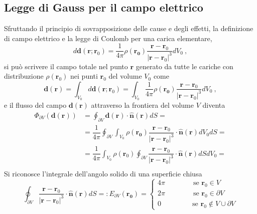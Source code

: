 \subsection{Legge di Gauss per il campo elettrico}
Sfruttando il principio di sovrapposizione delle cause e degli effetti, la definizione di campo elettrico e la legge di Coulomb per una carica elementare,
\begin{equation}
    d \mathbf{d}(\mathbf{r}; \mathbf{r}_0) = \dfrac{1}{4 \pi} \rho(\mathbf{r_0}) \dfrac{\mathbf{r} - \mathbf{r}_0}{|\mathbf{r} - \mathbf{r}_0|^3} dV_0 \ ,
\end{equation}
si può scrivere il campo totale nel punto $\mathbf{r}$ generato da tutte le cariche con distribuzione $\rho(\mathbf{r}_0)$ nei punti $\mathbf{r}_0$ del volume $V_0$ come
\begin{equation}
    \mathbf{d}(\mathbf{r}) = \int_{V_0} d \mathbf{d}(\mathbf{r}; \mathbf{r}_0 ) = 
    \int_{V_0} \dfrac{1}{4 \pi} \rho(\mathbf{r_0}) \dfrac{\mathbf{r} - \mathbf{r}_0}{|\mathbf{r} - \mathbf{r}_0|^3} dV_0   \ ,
\end{equation}
e il flusso del campo $\mathbf{d}(\mathbf{r})$ attraverso la frontiera del volume $V$ diventa
\begin{equation}
\begin{aligned}
    \Phi_{\partial V}(\mathbf{d}(\mathbf{r}))
    & = \oint_{\partial V} \mathbf{d}(\mathbf{r}) \cdot \mathbf{\hat{n}}(\mathbf{r}) dS = \\
    & = \dfrac{1}{4\pi} \oint_{\partial V} \int_{V_0} \rho(\mathbf{r_0}) \dfrac{\mathbf{r} - \mathbf{r}_0}{|\mathbf{r} - \mathbf{r}_0|^3} \cdot \mathbf{\hat{n}}(\mathbf{r}) dV_0 dS = \\
    & = \dfrac{1}{4\pi}  \int_{V_0} \rho(\mathbf{r}_0) \oint_{\partial V} \dfrac{\mathbf{r} - \mathbf{r}_0}{|\mathbf{r} - \mathbf{r}_0|^3} \cdot \mathbf{\hat{n}}(\mathbf{r}) dS dV_0 = \\
\end{aligned}
\end{equation}
Si riconosce l'integrale dell'angolo solido di una superficie chiusa
\begin{equation}
    \oint_{\partial V} \dfrac{\mathbf{r} - \mathbf{r}_0}{|\mathbf{r} - \mathbf{r}_0|^3} \cdot \mathbf{\hat{n}}(\mathbf{r}) dS =: E_{\partial V}(\mathbf{r_0}) = 
    \begin{cases}
        4 \pi \qquad \qquad \text{se $\mathbf{r}_0 \in V$} \\
        2 \pi \qquad \qquad \text{se $\mathbf{r}_0 \in \partial V$} \\
        0 \ \   \qquad \qquad \text{se $\mathbf{r}_0 \notin V \cup \partial V$} 
    \end{cases}
\end{equation}
